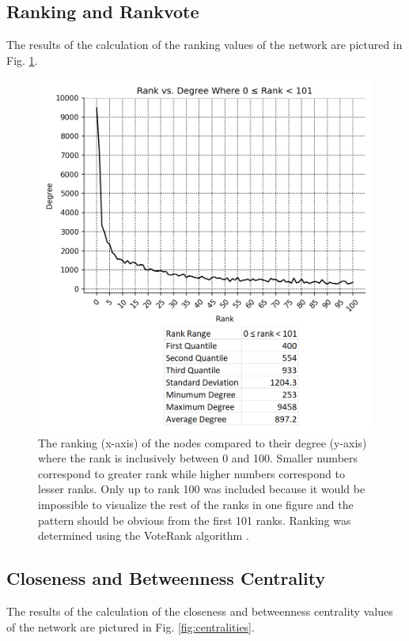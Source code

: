 \documentclass[9pt,twocolumn,twoside]{pnas-new}
\begin{document}
\subsection{Ranking and Rankvote} The results of the calculation of the ranking values of the network are pictured in Fig. \ref{fig:vote_ranks}.

\begin{figure}
\centering
\includegraphics[width=.8\linewidth]{vote_ranks}
\caption{The ranking (x-axis) of the nodes compared to their degree (y-axis) where the rank is inclusively between 0 and 100. Smaller numbers correspond to greater rank while higher numbers correspond to lesser ranks. Only up to rank 100 was included because it would be impossible to visualize the rest of the ranks in one figure and the pattern should be obvious from the first 101 ranks. Ranking was determined using the VoteRank algorithm \cite{networkxvoteranks}.
}
\label{fig:vote_ranks}
\end{figure}

\subsection{Closeness and Betweenness Centrality} The results of the calculation of the closeness and betweenness centrality values of the network are pictured in Fig. \ref{fig:centralities}.
\end{document}
